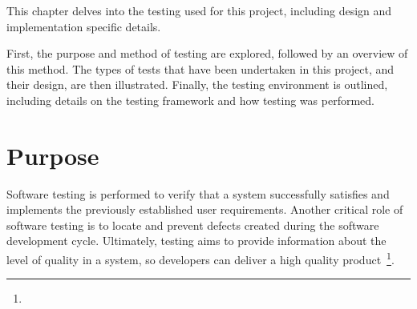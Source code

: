 
This chapter delves into the testing used for this project, including design and implementation specific details.

First, the purpose and method of testing are explored, followed by an overview of this method. The types of tests that have been undertaken in this project, and their design, are then illustrated. Finally, the testing environment is outlined, including details on the testing framework and how testing was performed.

\section{Purpose} {
\label{sec:testing_purpose}

	Software testing is performed to verify that a system successfully satisfies and implements the previously established user requirements. Another critical role of software testing is to locate and prevent defects created during the software development cycle. Ultimately, testing aims to provide information about the level of quality in a system, so developers can deliver a high quality product~\footnote{}.

}

